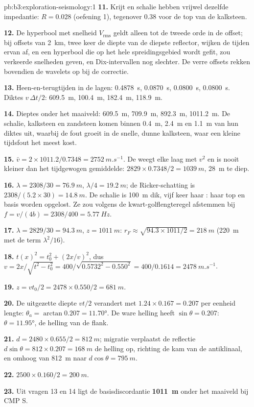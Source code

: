\begin{solution}{pb:b3:exploration-seismology:1}
\textbf{11.} Krijt en schalie hebben vrijwel dezelfde impedantie: $R = 0.028$
(oefening 1), tegenover 0.38 voor de top van de kalksteen.

\textbf{12.} De hyperbool met snelheid $V_{\text{rms}}$ geldt alleen tot de
tweede orde in de offset; bij offsets van \qty{2}{km}, twee keer de diepte
van de diepste reflector, wijken de tijden ervan af, en een hyperbool die op
het hele spreidingsgebied wordt gefit, zou verkeerde snelheden geven, en Dix-intervallen nog slechter. De verre offsets
rekken bovendien de wavelets op bij de correctie.

\textbf{13.} Heen-en-terugtijden in de lagen: \qty{0.4878}{s}, \qty{0.0870}{s},
\qty{0.0800}{s}, \qty{0.0800}{s}. Diktes $v\,\Delta t/2$: \qty{609.5}{m},
\qty{100.4}{m}, \qty{182.4}{m}, \qty{118.9}{m}.

\textbf{14.} Dieptes onder het maaiveld: \qty{609.5}{m}, \qty{709.9}{m},
\qty{892.3}{m}, \qty{1011.2}{m}. De schalie, kalksteen en zandsteen komen
binnen \qty{0.4}{m}, \qty{2.4}{m} en \qty{1.1}{m} van hun diktes uit, waarbij
de fout groeit in de snelle, dunne kalksteen, waar een kleine tijdsfout het
meest kost.

\textbf{15.} $\bar v = 2\times1011.2/0.7348 = \qty{2752}{m.s^{-1}}$. De
 weegt elke laag met $v^2$ en is nooit kleiner dan het
tijdgewogen gemiddelde: $2829\times0.7348/2 = \qty{1039}{m}$, \qty{28}{m} te diep.

\textbf{16.} $\lambda = 2308/30 = \qty{76.9}{m}$, $\lambda/4 = \qty{19.2}{m}$;
de Ricker-schatting is $2308/(5.2\times30) = \qty{14.8}{m}$. De schalie is
\qty{100}{m} dik, vijf keer haar : haar top en basis worden
opgelost. Ze zou volgens de kwart-golflengteregel afstemmen bij $f = v/(4b) =
2308/400 = \qty{5.77}{Hz}$.

\textbf{17.} $\lambda = 2829/30 = \qty{94.3}{m}$, $z = \qty{1011}{m}$:
$r_F \approx \sqrt{94.3\times1011/2} = \qty{218}{m}$ (\qty{220}{m} met de
term $\lambda^2/16$).

\textbf{18.} $t(x)^2 = t_0^2 + (2x/v)^2$, dus $v = 2x/\sqrt{t^2 - t_0^2} =
400/\sqrt{0.5732^2 - 0.550^2} = 400/0.1614 = \qty{2478}{m.s^{-1}}$.

\textbf{19.} $z = vt_0/2 = 2478\times0.550/2 = \qty{681}{m}$.

\textbf{20.} De uitgezette diepte $vt/2$ verandert met $1.24\times0.167 = 0.207$
per eenheid lengte: $\theta_a = \arctan0.207 = \ang{11.70}$. De ware helling
heeft $\sin\theta = 0.207$: $\theta = \ang{11.95}$, de helling van de flank.

\textbf{21.} $d = 2480\times0.655/2 = \qty{812}{m}$; migratie verplaatst de
reflectie $d\sin\theta = 812\times0.207 = \qty{168}{m}$ de helling op, richting de
kam van de antiklinaal, en omhoog van \qty{812}{m} naar $d\cos\theta =
\qty{795}{m}$.

\textbf{22.} $2500\times0.160/2 = \qty{200}{m}$.

\textbf{23.} Uit vragen 13 en 14 ligt de basisdiscordantie
\textbf{\qty[text-series-to-math=true]{1011}{m}} onder het maaiveld bij CMP S.
\end{solution}
